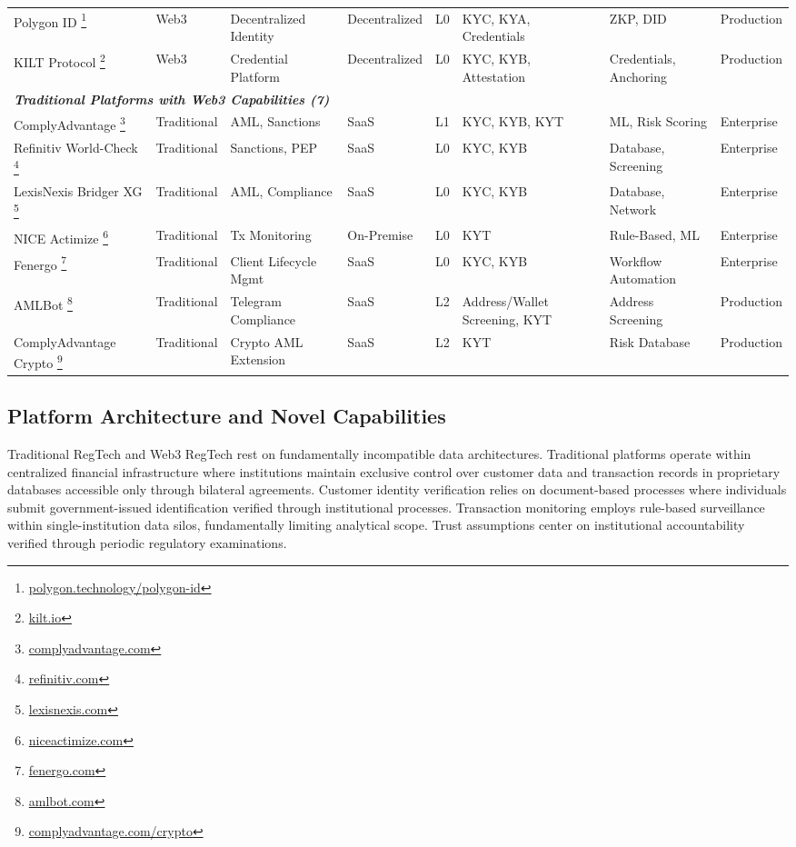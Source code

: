 \begin{table}[htbp]
\begin{tabularx}{\textwidth}{p{1.5cm}p{0.9cm}X p{1.1cm}p{1.2cm}p{1.1cm}X p{0.9cm}}
Polygon ID \footnote{\url{polygon.technology/polygon-id}} & Web3 & Decentralized Identity & Decentralized & L0 & KYC, KYA, Credentials & ZKP, DID & Production \\
KILT Protocol \footnote{\url{kilt.io}} & Web3 & Credential Platform & Decentralized & L0 & KYC, KYB, Attestation & Credentials, Anchoring & Production \\
\hline
\multicolumn{8}{l}{\textit{\textbf{Traditional Platforms with Web3 Capabilities (7)}}} \\
\hline
ComplyAdvantage \footnote{\url{complyadvantage.com}} & Traditional & AML, Sanctions & SaaS & L1 & KYC, KYB, KYT & ML, Risk Scoring & Enterprise \\
Refinitiv World-Check \footnote{\url{refinitiv.com}} & Traditional & Sanctions, PEP & SaaS & L0 & KYC, KYB & Database, Screening & Enterprise \\
LexisNexis Bridger XG \footnote{\url{lexisnexis.com}} & Traditional & AML, Compliance & SaaS & L0 & KYC, KYB & Database, Network & Enterprise \\
NICE Actimize \footnote{\url{niceactimize.com}} & Traditional & Tx Monitoring & On-Premise & L0 & KYT & Rule-Based, ML & Enterprise \\
Fenergo \footnote{\url{fenergo.com}} & Traditional & Client Lifecycle Mgmt & SaaS & L0 & KYC, KYB & Workflow Automation & Enterprise \\
AMLBot \footnote{\url{amlbot.com}} & Traditional & Telegram Compliance & SaaS & L2 & Address/Wallet Screening, KYT & Address Screening & Production \\
ComplyAdvantage Crypto \footnote{\url{complyadvantage.com/crypto}} & Traditional & Crypto AML Extension & SaaS & L2 & KYT & Risk Database & Production \\
\hline
\end{tabularx}
\end{table}



\subsection{Platform Architecture and Novel Capabilities}

Traditional RegTech and Web3 RegTech rest on fundamentally incompatible data architectures. Traditional platforms operate within centralized financial infrastructure where institutions maintain exclusive control over customer data and transaction records in proprietary databases accessible only through bilateral agreements. Customer identity verification relies on document-based processes where individuals submit government-issued identification verified through institutional processes. Transaction monitoring employs rule-based surveillance within single-institution data silos, fundamentally limiting analytical scope. Trust assumptions center on institutional accountability verified through periodic regulatory examinations.


